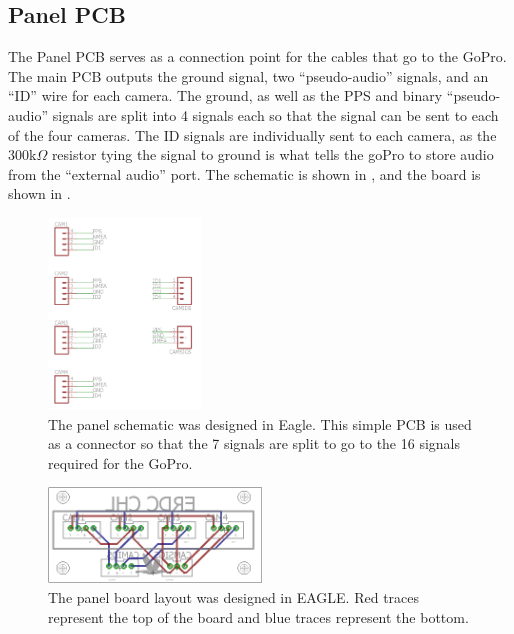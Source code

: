 \subsection{Panel PCB}
The Panel PCB serves as a connection point for the cables that go to the GoPro.  The main PCB outputs the ground signal, two ``pseudo-audio'' signals, and an ``ID'' wire for each camera.  The ground, as well as the PPS and binary ``pseudo-audio'' signals are split into 4 signals each so that the signal can be sent to each of the four cameras.  The ID signals are individually sent to each camera, as the 300k$\Omega$ resistor tying the signal to ground is what tells the goPro to store audio from the ``external audio'' port.  The schematic is shown in , and the board is shown in .
\begin{figure}[H]
	\centering
	\includegraphics[height = 2in]{../figures/panelZoomschematic.png}
	\caption{The panel schematic was designed in Eagle. This simple PCB is used as a connector so that the 7 signals are split to go to the 16 signals required for the GoPro.}
	\label{fig:panelschematic}
\end{figure}
\begin{figure}[h]
	\centering
	\includegraphics[height = 1in]{../figures/panelboard.png}
	\caption{The panel board layout was designed in EAGLE. Red traces represent the top of the board and blue traces represent the bottom.}
	\label{fig:panelboard}
\end{figure}

